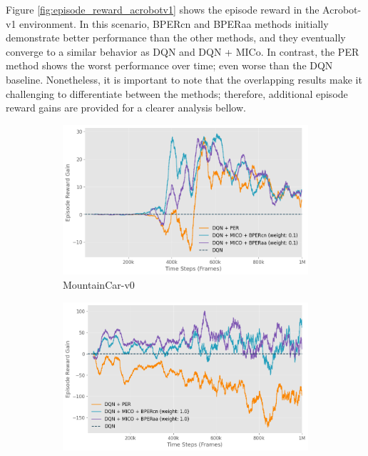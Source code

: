 Figure \ref{fig:episode_reward_acrobotv1} shows the episode reward in the Acrobot-v1 environment. In this scenario, BPERcn and BPERaa methods initially demonstrate better performance than the other methods, and they eventually converge to a similar behavior as DQN and DQN + MICo. In contrast, the PER method shows the worst performance over time; even worse than the DQN baseline. Nonetheless, it is important to note that the overlapping results make it challenging to differentiate between the methods; therefore, additional episode reward gains are provided for a clearer analysis bellow.

\begin{figure}[h]
    \centering
    \begin{subfigure}{0.45\textwidth}
    \includegraphics[width=\linewidth]{Results/general_results/mountain_car_reward_gain_vs_dqn.png}
        \caption{MountainCar-v0}
        \label{fig:mountain_car_reward_gain_vs_dqn}
    \end{subfigure}
    \hfill
    \begin{subfigure}{0.45\textwidth}
        \includegraphics[width=\linewidth]{Results/general_results/lunarlander_reward_gain_vs_dqn.png}

\end{subfigure}
\end{figure}
